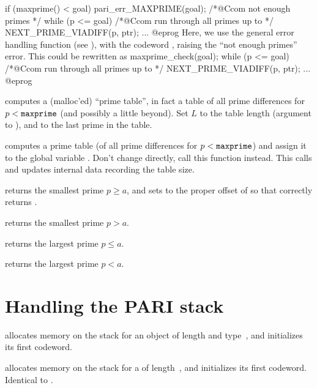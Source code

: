 if (maxprime() < goal) pari_err_MAXPRIME(goal); /*@Ccom not enough primes */
while (p <= goal) /*@Ccom run through all primes up to  */
{
  NEXT_PRIME_VIADIFF(p, ptr);
  ...
}
@eprog\noindent
Here, we use the general error handling function  (see
), with the codeword , raising the ``not enough
primes'' error. This could be rewritten as
\bprog
maxprime_check(goal);
while (p <= goal) /*@Ccom run through all primes up to  */
{
  NEXT_PRIME_VIADIFF(p, ptr);
  ...
}
@eprog

computes a (malloc'ed) ``prime table'', in fact a table of all prime
differences for $p < {\tt maxprime}$ (and possibly a little beyond). Set $L$
to the table length (argument to ), and  to the last
prime in the table.

 computes a prime table (of all prime
differences for $p < {\tt maxprime}$) and assign it to the global variable
. Don't change  directly, call this function
instead. This calls  and updates internal data recording the
table size.

returns the smallest prime $p \geq a$, and sets  to the proper offset
of  so that  correctly
returns .

 returns the smallest
prime $p > a$.

 returns the largest
prime $p \leq a$.

 returns the largest
prime $p < a$.

\section{Handling the PARI stack}


 allocates memory on the stack for
an object of length  and type~, and initializes its first
codeword.

 allocates memory on the stack for a 
of length~, and initializes its first codeword. Identical to
.

